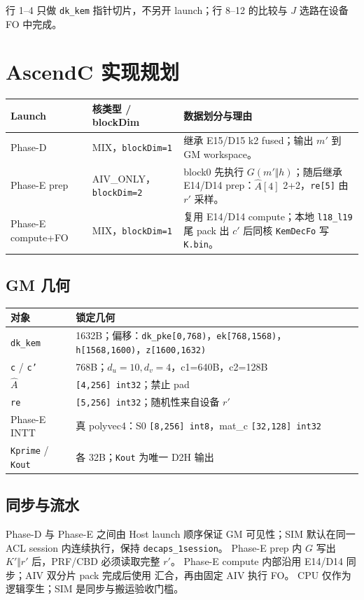 \documentclass[UTF8,a4paper,11pt]{ctexart}
\newcommand{\apiname}[1]{\texttt{\seqsplit{#1}}}
\begin{document}
行 1--4 只做 \texttt{dk\_kem} 指针切片，不另开 launch；行 8--12 的比较与 $J$ 选路在设备 FO 中完成。

\section{AscendC 实现规划}

\begin{longtable}{@{}L{2.8cm}L{3.1cm}L{7.2cm}@{}}
\toprule
Launch & 核类型 / blockDim & 数据划分与理由 \\
\midrule
Phase-D & MIX，\texttt{blockDim=1} & 继承 E15/D15 k2 fused；输出 $m'$ 到 GM workspace。 \\
Phase-E prep & AIV\_ONLY，\texttt{blockDim=2} & block0 先执行 $G(m'\Vert h)$；随后继承 E14/D14 prep：$\hat A[4]$ 2+2，\texttt{re[5]} 由 $r'$ 采样。 \\
Phase-E compute+FO & MIX，\texttt{blockDim=1} & 复用 E14/D14 compute；本地 \texttt{l18\_l19} 尾 pack 出 $c'$ 后同核 \texttt{KemDecFo} 写 \texttt{K.bin}。 \\
\bottomrule
\end{longtable}

\subsection{GM 几何}
\begin{longtable}{@{}L{3.8cm}L{9.3cm}@{}}
\toprule
对象 & 锁定几何 \\
\midrule
\texttt{dk\_kem} & 1632B；偏移：\texttt{dk\_pke[0,768)}，\texttt{ek[768,1568)}，\texttt{h[1568,1600)}，\texttt{z[1600,1632)} \\
\texttt{c} / \texttt{c'} & 768B；$d_u=10,d_v=4$，c1=640B，c2=128B \\
$\hat A$ & \texttt{[4,256] int32}；禁止 pad \\
\texttt{re} & \texttt{[5,256] int32}；随机性来自设备 $r'$ \\
Phase-E INTT & 真 polyvec4：S0 \texttt{[8,256] int8}，mat\_c \texttt{[32,128] int32} \\
\texttt{Kprime} / \texttt{Kout} & 各 32B；\texttt{Kout} 为唯一 D2H 输出 \\
\bottomrule
\end{longtable}

\subsection{同步与流水}
Phase-D 与 Phase-E 之间由 Host launch 顺序保证 GM 可见性；SIM 默认在同一 ACL session 内连续执行，保持 \texttt{decaps\_1session}。
Phase-E prep 内 $G$ 写出 $K'\Vert r'$ 后，PRF/CBD 必须读取完整 $r'$。
Phase-E compute 内部沿用 E14/D14 同步；AIV 双分片 pack 完成后使用 \apiname{SyncAll} 汇合，再由固定 AIV 执行 FO。
CPU 仅作为逻辑孪生；SIM 是同步与搬运验收门槛。
\end{document}

